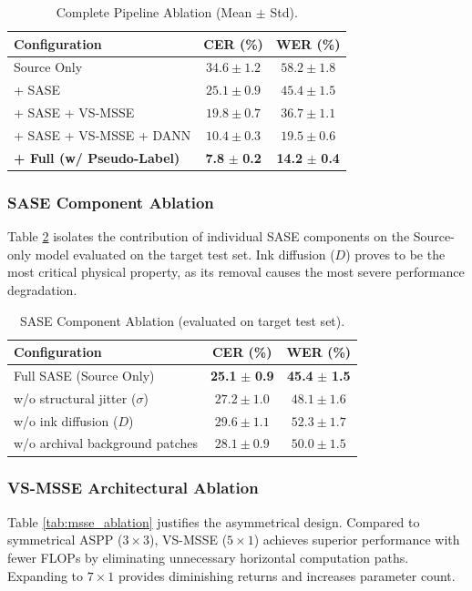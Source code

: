 \documentclass[11pt]{article}
\begin{document}
\begin{table}[htbp]
\centering
\caption{Complete Pipeline Ablation (Mean $\pm$ Std).}
\label{tab:pipeline_ablation}
\begin{tabular}{l c c}
\toprule
\textbf{Configuration} & \textbf{CER (\%)} & \textbf{WER (\%)} \\
\midrule
Source Only & $34.6 \pm 1.2$ & $58.2 \pm 1.8$ \\
+ SASE & $25.1 \pm 0.9$ & $45.4 \pm 1.5$ \\
+ SASE + VS-MSSE & $19.8 \pm 0.7$ & $36.7 \pm 1.1$ \\
+ SASE + VS-MSSE + DANN & $10.4 \pm 0.3$ & $19.5 \pm 0.6$ \\
\textbf{+ Full (w/ Pseudo-Label)} & \textbf{7.8} $\pm$ \textbf{0.2} & \textbf{14.2} $\pm$ \textbf{0.4} \\
\bottomrule
\end{tabular}
\end{table}

\subsubsection{SASE Component Ablation}
Table \ref{tab:sase_ablation} isolates the contribution of individual SASE components on the Source-only model evaluated on the target test set. Ink diffusion ($D$) proves to be the most critical physical property, as its removal causes the most severe performance degradation.

\begin{table}[htbp]
\centering
\caption{SASE Component Ablation (evaluated on target test set).}
\label{tab:sase_ablation}
\begin{tabular}{l c c}
\toprule
\textbf{Configuration} & \textbf{CER (\%)} & \textbf{WER (\%)} \\
\midrule
Full SASE (Source Only) & \textbf{25.1} $\pm$ \textbf{0.9} & \textbf{45.4} $\pm$ \textbf{1.5} \\
\midrule
w/o structural jitter ($\sigma$) & $27.2 \pm 1.0$ & $48.1 \pm 1.6$ \\
w/o ink diffusion ($D$) & $29.6 \pm 1.1$ & $52.3 \pm 1.7$ \\
w/o archival background patches & $28.1 \pm 0.9$ & $50.0 \pm 1.5$ \\
\bottomrule
\end{tabular}
\end{table}

\subsubsection{VS-MSSE Architectural Ablation}
Table \ref{tab:msse_ablation} justifies the asymmetrical design. Compared to symmetrical ASPP ($3\times3$), VS-MSSE ($5\times1$) achieves superior performance with fewer FLOPs by eliminating unnecessary horizontal computation paths. Expanding to $7\times1$ provides diminishing returns and increases parameter count. 
\end{document}
